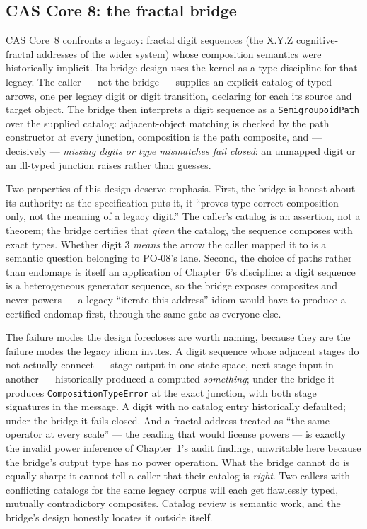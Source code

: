 \subsection{CAS Core 8: the fractal bridge}\label{ch12:sec:core8}

CAS Core~8 confronts a legacy: fractal digit sequences (the X.Y.Z
cognitive-fractal addresses of the wider system) whose composition
semantics were historically implicit. Its bridge design uses the kernel
as a type discipline for that legacy. The caller --- not the bridge ---
supplies an explicit catalog of typed arrows, one per legacy digit or
digit transition, declaring for each its source and target object. The
bridge then interprets a digit sequence as a \texttt{SemigroupoidPath}
over the supplied catalog: adjacent-object matching is checked by the
path constructor at every junction, composition is the path composite,
and --- decisively --- \emph{missing digits or type mismatches fail
closed}: an unmapped digit or an ill-typed junction raises rather than
guesses.

Two properties of this design deserve emphasis. First, the bridge is
honest about its authority: as the specification puts it, it ``proves
type-correct composition only, not the meaning of a legacy digit.'' The
caller's catalog is an assertion, not a theorem; the bridge certifies
that \emph{given} the catalog, the sequence composes with exact types.
Whether digit 3 \emph{means} the arrow the caller mapped it to is a
semantic question belonging to PO-08's lane. Second, the choice of
paths rather than endomaps is itself an application of Chapter~6's
discipline: a digit sequence is a heterogeneous generator sequence,
so the bridge exposes composites and never powers --- a legacy
``iterate this address'' idiom would have to produce a certified
endomap first, through the same gate as everyone else.

The failure modes the design forecloses are worth naming, because they
are the failure modes the legacy idiom invites. A digit sequence whose
adjacent stages do not actually connect --- stage output in one state
space, next stage input in another --- historically produced a
computed \emph{something}; under the bridge it produces
\texttt{CompositionTypeError} at the exact junction, with both stage
signatures in the message. A digit with no catalog entry historically
defaulted; under the bridge it fails closed. And a fractal address
treated as ``the same operator at every scale'' --- the reading that
would license powers --- is exactly the invalid power inference of
Chapter~1's audit findings, unwritable here because the bridge's output
type has no power operation. What the bridge cannot do is equally
sharp: it cannot tell a caller that their catalog is \emph{right}. Two
callers with conflicting catalogs for the same legacy corpus will each
get flawlessly typed, mutually contradictory composites. Catalog
review is semantic work, and the bridge's design honestly locates it
outside itself.

